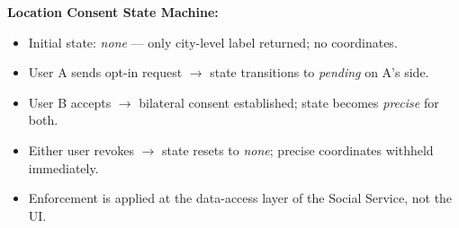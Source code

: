 \documentclass[12pt,a4paper]{article}
\begin{document}
\textbf{Location Consent State Machine:}
\begin{itemize}[noitemsep]
  \item Initial state: \textit{none} — only city-level label returned; no coordinates.
  \item User A sends opt-in request $\to$ state transitions to \textit{pending} on A's side.
  \item User B accepts $\to$ bilateral consent established; state becomes \textit{precise} for
        both.
  \item Either user revokes $\to$ state resets to \textit{none}; precise coordinates withheld
        immediately.
  \item Enforcement is applied at the data-access layer of the Social Service, not the UI.
\end{itemize}
\end{document}
